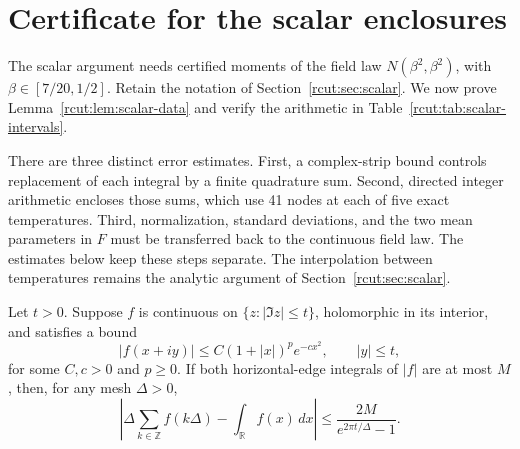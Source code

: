 \section{Certificate for the scalar enclosures}
\label{rcut:sec:scalar-certificate}

The scalar argument needs certified moments of the field law
\(N(\beta^2,\beta^2)\), with \(\beta\in[7/20,1/2]\). Retain the notation
of Section~\ref{rcut:sec:scalar}. We now prove
Lemma~\ref{rcut:lem:scalar-data} and verify the arithmetic in
Table~\ref{rcut:tab:scalar-intervals}.

There are three distinct error estimates. First, a complex-strip bound
controls replacement of each integral by a finite quadrature sum.
Second, directed integer arithmetic encloses those sums, which use
41 nodes at each of five exact temperatures. Third, normalization,
standard deviations, and the two mean parameters in \(F\) must be
transferred back to the continuous field law. The estimates below keep
these steps separate. The interpolation between temperatures remains the
analytic argument of Section~\ref{rcut:sec:scalar}.

\begin{lemma}
\label{rcut:lem:scalar-trapezoid}
Let \(t>0\).
Suppose \(f\) is continuous on \(\{z:|\Im z|\leq t\}\), holomorphic
in its interior, and satisfies a bound
\[
 |f(x+iy)|\leq C(1+|x|)^p e^{-c x^2},\qquad |y|\leq t,
\]
for some \(C,c>0\) and \(p\geq0\). If both horizontal-edge integrals
of \(|f|\) are at most \(M\), then, for any mesh \(\Delta>0\),
\begin{equation}
 \left|\Delta\sum_{k\in\mathbb Z}f(k\Delta)
                  -\int_{\mathbb R}f(x)\,dx\right|
 \leq\frac{2M}{e^{2\pi t/\Delta}-1}.
 \label{rcut:eq:scalar-trapezoid-error}
\end{equation}
\end{lemma}

